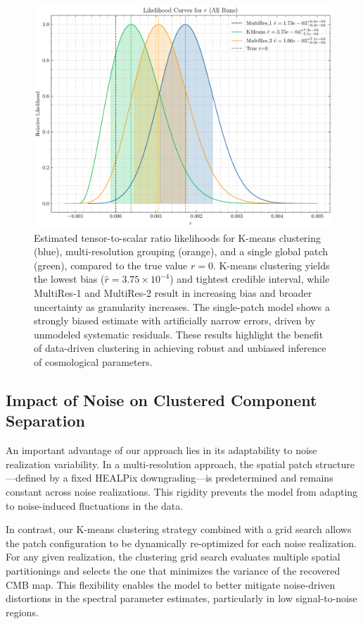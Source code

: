 \documentclass[%
 reprint,
bibnotes,
 amsmath,amssymb,
 aps,
floatfix, 
]{revtex4-2}
\begin{document}
\vspace{-1em}

\begin{figure}[!ht]
    \centering
    \includegraphics[width=0.55\linewidth]{figures/r_likelihood_distribution.pdf}
    \caption{
    Estimated tensor-to-scalar ratio likelihoods for K-means clustering (blue), multi-resolution grouping (orange), and a single global patch (green), compared to the true value \( r = 0 \). 
    K-means clustering yields the lowest bias (\( \hat{r} = 3.75 \times 10^{-4} \)) and tightest credible interval, while MultiRes-1 and MultiRes-2 result in increasing bias and broader uncertainty as granularity increases. 
    The single-patch model shows a strongly biased estimate with artificially narrow errors, driven by unmodeled systematic residuals. 
    These results highlight the benefit of data-driven clustering in achieving robust and unbiased inference of cosmological parameters.
    }
    \label{fig:r_likelihood_comparison}
\end{figure}


\subsection{Impact of Noise on Clustered Component Separation}
\label{subsec:noise_impact}

An important advantage of our approach lies in its adaptability to noise realization variability. In a multi-resolution approach, the spatial patch structure—defined by a fixed HEALPix downgrading—is predetermined and remains constant across noise realizations. This rigidity prevents the model from adapting to noise-induced fluctuations in the data.

In contrast, our K-means clustering strategy combined with a grid search allows the patch configuration to be dynamically re-optimized for each noise realization. For any given realization, the clustering grid search evaluates multiple spatial partitionings and selects the one that minimizes the variance of the recovered CMB map. This flexibility enables the model to better mitigate noise-driven distortions in the spectral parameter estimates, particularly in low signal-to-noise regions.
\end{document}
